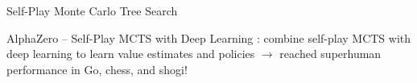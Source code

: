 \begin{frame}[t]{Self-Play Monte Carlo Tree Search}
\end{frame}

\begin{frame}[t]{AlphaZero -- Self-Play MCTS with Deep Learning}
    : combine self-play MCTS with deep learning to learn value estimates and policies $\rightarrow$ reached superhuman performance in Go, chess, and shogi!

    \vspace{.5em}

    \begin{minipage}{.69\textwidth}


\end{minipage}
\end{frame}
